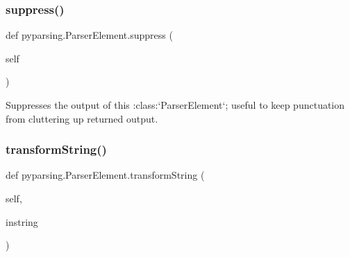 \mbox{\label{classpyparsing_1_1ParserElement_aa59fe575380165c82b618b55e91ef0a5}} 
\subsubsection{\texorpdfstring{suppress()}{suppress()}}
{\footnotesize\ttfamily def pyparsing.\+Parser\+Element.\+suppress (\begin{DoxyParamCaption}\item[{}]{self }\end{DoxyParamCaption})}

\begin{DoxyVerb}Suppresses the output of this :class:`ParserElement`; useful to keep punctuation from
cluttering up returned output.
\end{DoxyVerb}
 \mbox{\label{classpyparsing_1_1ParserElement_aafab376b2c6bc61873e532f2042d5425}} 
\subsubsection{\texorpdfstring{transform\+String()}{transformString()}}
{\footnotesize\ttfamily def pyparsing.\+Parser\+Element.\+transform\+String (\begin{DoxyParamCaption}\item[{}]{self,  }\item[{}]{instring }\end{DoxyParamCaption})}

